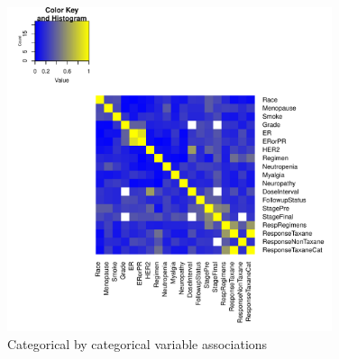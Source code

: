 \documentclass[12pt]{article}
\begin{document}
\begin{figure}[h]
\caption{Categorical by categorical variable associations}
\centering
\includegraphics[width=0.85\textwidth]{CramerV}
\end{figure}
\end{document}
